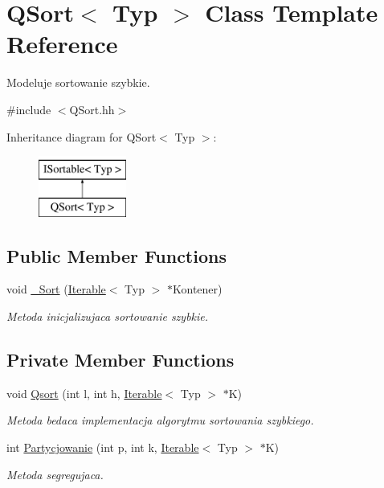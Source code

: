 \hypertarget{class_q_sort}{\section{Q\-Sort$<$ Typ $>$ Class Template Reference}
\label{class_q_sort}
}


Modeluje sortowanie szybkie.  




{\ttfamily \#include $<$Q\-Sort.\-hh$>$}

Inheritance diagram for Q\-Sort$<$ Typ $>$\-:\begin{figure}[H]
\begin{center}
\leavevmode
\includegraphics[height=2.000000cm]{class_q_sort}
\end{center}
\end{figure}
\subsection*{Public Member Functions}
\begin{DoxyCompactItemize}
\item 
void \hyperlink{class_q_sort_a059dc69db4a44032648c766e20c92126}{\-\_\-\-Sort} (\hyperlink{class_iterable}{Iterable}$<$ Typ $>$ $\ast$Kontener)
\begin{DoxyCompactList}\small\item\em Metoda inicjalizujaca sortowanie szybkie. \end{DoxyCompactList}\end{DoxyCompactItemize}
\subsection*{Private Member Functions}
\begin{DoxyCompactItemize}
\item 
void \hyperlink{class_q_sort_ad65785cc38373aa2ac7750c26b85cdd3}{Qsort} (int l, int h, \hyperlink{class_iterable}{Iterable}$<$ Typ $>$ $\ast$K)
\begin{DoxyCompactList}\small\item\em Metoda bedaca implementacja algorytmu sortowania szybkiego. \end{DoxyCompactList}\item 
int \hyperlink{class_q_sort_ae579d127add3ee9b5a004752fee8d20c}{Partycjowanie} (int p, int k, \hyperlink{class_iterable}{Iterable}$<$ Typ $>$ $\ast$K)
\begin{DoxyCompactList}\small\item\em Metoda segregujaca. \end{DoxyCompactList}\end{DoxyCompactItemize}


